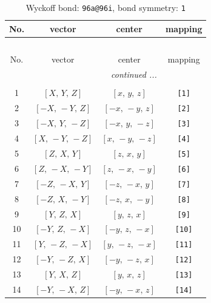 \documentclass[fleqn,8pt]{jsarticle}
\begin{document}
\begin{longtable}{cccc}
\caption{Wyckoff bond: {\tt 96a@96i}, bond symmetry: {\tt 1}}
 \\
 \hline \hline
No. & vector & center & mapping \\ \hline \endfirsthead

\multicolumn{3}{l}{\tablename\ \thetable{}} \\
 \hline \hline
No. & vector & center & mapping \\ \hline \endhead

 \hline \hline
\multicolumn{3}{r}{\footnotesize\it continued ...} \\ \endfoot

 \hline \hline
\multicolumn{3}{r}{} \\ \endlastfoot

1 & $\left[ X,\, Y,\, Z \right]$ & $\left[ x,\, y,\, z \right]$ & {\tt [1]} \\ \hline
2 & $\left[ - X,\, - Y,\, Z \right]$ & $\left[ - x,\, - y,\, z \right]$ & {\tt [2]} \\ \hline
3 & $\left[ - X,\, Y,\, - Z \right]$ & $\left[ - x,\, y,\, - z \right]$ & {\tt [3]} \\ \hline
4 & $\left[ X,\, - Y,\, - Z \right]$ & $\left[ x,\, - y,\, - z \right]$ & {\tt [4]} \\ \hline
5 & $\left[ Z,\, X,\, Y \right]$ & $\left[ z,\, x,\, y \right]$ & {\tt [5]} \\ \hline
6 & $\left[ Z,\, - X,\, - Y \right]$ & $\left[ z,\, - x,\, - y \right]$ & {\tt [6]} \\ \hline
7 & $\left[ - Z,\, - X,\, Y \right]$ & $\left[ - z,\, - x,\, y \right]$ & {\tt [7]} \\ \hline
8 & $\left[ - Z,\, X,\, - Y \right]$ & $\left[ - z,\, x,\, - y \right]$ & {\tt [8]} \\ \hline
9 & $\left[ Y,\, Z,\, X \right]$ & $\left[ y,\, z,\, x \right]$ & {\tt [9]} \\ \hline
10 & $\left[ - Y,\, Z,\, - X \right]$ & $\left[ - y,\, z,\, - x \right]$ & {\tt [10]} \\ \hline
11 & $\left[ Y,\, - Z,\, - X \right]$ & $\left[ y,\, - z,\, - x \right]$ & {\tt [11]} \\ \hline
12 & $\left[ - Y,\, - Z,\, X \right]$ & $\left[ - y,\, - z,\, x \right]$ & {\tt [12]} \\ \hline
13 & $\left[ Y,\, X,\, Z \right]$ & $\left[ y,\, x,\, z \right]$ & {\tt [13]} \\ \hline
14 & $\left[ - Y,\, - X,\, Z \right]$ & $\left[ - y,\, - x,\, z \right]$ & {\tt [14]} \\ \hline

\end{longtable}
\end{document}
